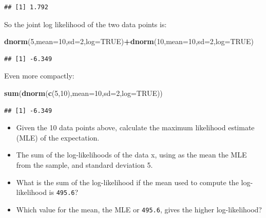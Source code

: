 \documentclass[12pt,]{krantz}
\newenvironment{Shaded}{\begin{snugshade}}{\end{snugshade}}
\newcommand{\DataTypeTok}[1]{\textcolor[rgb]{0.13,0.29,0.53}{#1}}
\newcommand{\DecValTok}[1]{\textcolor[rgb]{0.00,0.00,0.81}{#1}}
\newcommand{\KeywordTok}[1]{\textcolor[rgb]{0.13,0.29,0.53}{\textbf{#1}}}
\newcommand{\NormalTok}[1]{#1}
\newcommand{\OperatorTok}[1]{\textcolor[rgb]{0.81,0.36,0.00}{\textbf{#1}}}
\newcommand{\OtherTok}[1]{\textcolor[rgb]{0.56,0.35,0.01}{#1}}
\providecommand{\tightlist}{%
  \setlength{\itemsep}{0pt}\setlength{\parskip}{0pt}}
\begin{document}
\begin{verbatim}
## [1] 1.792
\end{verbatim}

So the joint log likelihood of the two data points is:

\begin{Shaded}
\begin{Highlighting}[]
\KeywordTok{dnorm}\NormalTok{(}\DecValTok{5}\NormalTok{,}\DataTypeTok{mean=}\DecValTok{10}\NormalTok{,}\DataTypeTok{sd=}\DecValTok{2}\NormalTok{,}\DataTypeTok{log=}\OtherTok{TRUE}\NormalTok{)}\OperatorTok{+}\KeywordTok{dnorm}\NormalTok{(}\DecValTok{10}\NormalTok{,}\DataTypeTok{mean=}\DecValTok{10}\NormalTok{,}\DataTypeTok{sd=}\DecValTok{2}\NormalTok{,}\DataTypeTok{log=}\OtherTok{TRUE}\NormalTok{)}
\end{Highlighting}
\end{Shaded}

\begin{verbatim}
## [1] -6.349
\end{verbatim}

Even more compactly:

\begin{Shaded}
\begin{Highlighting}[]
\KeywordTok{sum}\NormalTok{(}\KeywordTok{dnorm}\NormalTok{(}\KeywordTok{c}\NormalTok{(}\DecValTok{5}\NormalTok{,}\DecValTok{10}\NormalTok{),}\DataTypeTok{mean=}\DecValTok{10}\NormalTok{,}\DataTypeTok{sd=}\DecValTok{2}\NormalTok{,}\DataTypeTok{log=}\OtherTok{TRUE}\NormalTok{))}
\end{Highlighting}
\end{Shaded}

\begin{verbatim}
## [1] -6.349
\end{verbatim}

\begin{itemize}
\tightlist
\item
  Given the 10 data points above, calculate the maximum likelihood estimate (MLE) of the expectation.
\item
  The sum of the log-likelihoods of the data x, using as the mean the MLE from the sample, and standard deviation 5.
\item
  What is the sum of the log-likelihood if the mean used to compute the log-likelihood is \texttt{495.6}?
\item
  Which value for the mean, the MLE or \texttt{495.6}, gives the higher log-likelihood?
\end{itemize}
\end{document}
